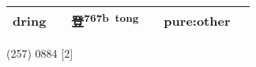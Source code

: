 \documentclass[14pt,a4paper]{scrartcl}
\begin{document}
\begin{longtable}[c]{@{}llllll@{}}
\begin{minipage}[t]{0.14\columnwidth}\raggedright\strut
dring
\strut\end{minipage} &
\begin{minipage}[t]{0.14\columnwidth}\raggedright\strut
\strut\end{minipage} &
\begin{minipage}[t]{0.14\columnwidth}\raggedright\strut
登\textsuperscript{767b~tong}
\strut\end{minipage} &
\begin{minipage}[t]{0.14\columnwidth}\raggedright\strut
\strut\end{minipage} &
\begin{minipage}[t]{0.14\columnwidth}\raggedright\strut
pure:other
\strut\end{minipage}\tabularnewline
\bottomrule
\end{longtable}

(257) 0884 {[}2{]}
\end{document}
